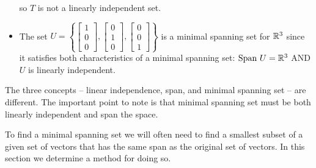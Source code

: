 \begin{itemize}
so $T$ is not a linearly independent set.
\item The set $U = \left\{ \left[ \begin{array}{c} 1 \\ 0 \\ 0 \end{array} \right], \left[ \begin{array}{c} 0 \\ 1 \\ 0 \end{array} \right] , \left[ \begin{array}{c} 0 \\ 0 \\ 1 \end{array} \right]  \right\}$ is a minimal spanning set for $\mathbb{R}^3$ since it satisfies both characteristics of a minimal spanning set: $\text{Span} \ U = \mathbb{R}^3$ AND $U$ is linearly independent. 
\end{itemize}
The three concepts -- linear independence, span, and minimal spanning set -- are different. The important point to note is that minimal spanning set must be both linearly independent and span the space. 

To find a minimal spanning set we will often need to find a smallest subset of a given set of vectors that has the same span as the original set of vectors. In this section we determine a method for doing so. 

